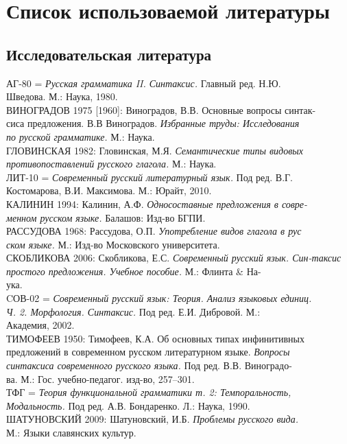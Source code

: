 \newcommand{\indenttext}{\hspace*{4ex}}
\newcommand{\cutline}{\\\indenttext}
\newcommand{\cutword}{-\cutline}

\section*{Список использоваемой литературы}
\setlength{\parindent}{0cm}
\begin{normalsize}
\subsection*{Исследовательская литература}
АГ-80 = \textit{Русская грамматика II. Синтаксис.} Главный ред. Н.Ю.\cutline Шведова. М.: Наука, 1980.\\
ВИНОГРАДОВ 1975 [1960]: Виноградов, В.В. Основные вопросы синтак\cutword сиса предложения. В.В Виноградов. \textit{Избранные труды: Исследования\cutline по русской грамматике.} М.: Наука.\\
ГЛОВИНСКАЯ 1982: Гловинская, М.Я. \textit{Семантические типы видовых\cutline противопоставлений русского глагола.} М.: Наука.\\
ЛИТ-10 = \textit{Современный русский литературный язык.} Под ред. В.Г.\cutline Костомарова, В.И. Максимова. М.: Юрайт, 2010.\\
КАЛИНИН 1994: Калинин, А.Ф. \textit{Односоставные предложения в совре\cutword менном русском языке.} Балашов: Изд-во БГПИ. \\
РАССУДОВА 1968: Рассудова, О.П. \textit{Употребление видов глагола в рус\cutline ском языке.} М.: Изд-во Московского университета.\\
СКОБЛИКОВА 2006: Скобликова, Е.С. \textit{Современный русский язык. Син-\indenttext таксис простого предложения. Учебное пособие.} М.: Флинта \& На\cutword ука.\\
CОВ-02 = \textit{Современный русский язык: Теория. Анализ языковых единиц.\cutline Ч. 2. Морфология. Синтаксис.} Под ред. Е.И. Дибровой. М.:\cutline Академия, 2002.\\
ТИМОФЕЕВ 1950: Тимофеев, К.А. Об основных типах инфинитивных \indenttext предложений в современном русском литературном языке. \textit{Вопросы \cutline синтаксиса современного русского языка.} Под ред. В.В. Виноградо\cutword ва. М.: Гос. учебно-педагог. изд-во, 257--301.\\
ТФГ = \textit{Теория функциональной грамматики т. 2: Темпоральность, \cutline Модальность.} Под ред. А.В. Бондаренко. Л.: Наука, 1990.\\
ШАТУНОВСКИЙ 2009: Шатуновский, И.Б. \textit{Проблемы русского вида.} \cutline М.: Языки славянских культур.
\end{normalsize}
